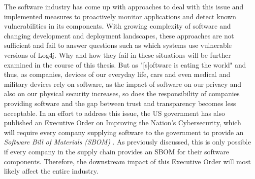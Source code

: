 The software industry has come up with approaches to deal with this issue and implemented measures to proactively monitor applications and detect known vulnerabilities in its components. With growing complexity of software and changing development and deployment landscapes, these approaches are not sufficient and fail to answer questions such as which systems use vulnerable versions of Log4j. Why and how they fail in these situations will be further examined in the course of this thesis. 
But as "[s]oftware is eating the world"\cite{MarcAndreessen} and thus, as companies, devices of our everyday life, cars and even medical and military devices rely on software, as the impact of software on our privacy and also on our physical security increases, so does the responsibility of companies providing software and the gap between trust and transparency becomes less acceptable. %
In an effort to address this issue, the US government has also published an Executive Order on Improving the Nation's Cybersecurity, which will require every company supplying software to the government to provide an \textit{Software Bill of Materials (SBOM)} \cite{ExecutiveOrderSBOM,NTIASBOM}. As previously discussed, this is only possible if every company in the supply chain provides an SBOM for their software components. Therefore, the downstream impact of this Executive Order will most likely affect the entire industry.

